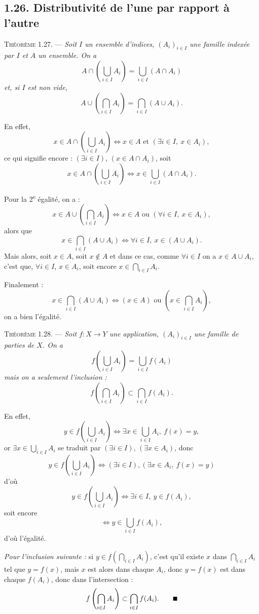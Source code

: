 \subsection*{1.26. Distributivité de l'une par rapport à l'autre}

\medskip\noindent\textsc{Théorème 1.27.} --- \emph{Soit $I$ un ensemble d'indices, $(A_i)_{i\in I}$ une famille indexée par $I$ et $A$ un ensemble. On a}
\[
A\cap\left(\bigcup_{i\in I}A_i\right)=\bigcup_{i\in I}(A\cap A_i)
\]
\emph{et, si $I$ est non vide,}
\[
A\cup\left(\bigcap_{i\in I}A_i\right)=\bigcap_{i\in I}(A\cup A_i).
\]

En effet,
\[
x\in A\cap\left(\bigcup_{i\in I}A_i\right)\Leftrightarrow x\in A\text{ et }(\exists i\in I,\ x\in A_i),
\]
ce qui signifie encore : $(\exists i\in I)$, $(x\in A\cap A_i)$, soit
\[
x\in A\cap\left(\bigcup_{i\in I}A_i\right)\Leftrightarrow x\in\bigcup_{i\in I}(A\cap A_i).
\]

Pour la 2\textsuperscript{e} égalité, on a :
\[
x\in A\cup\left(\bigcap_{i\in I}A_i\right)\Leftrightarrow x\in A\text{ ou }(\forall i\in I,\ x\in A_i),
\]
alors que
\[
x\in\bigcap_{i\in I}(A\cup A_i)\Leftrightarrow\forall i\in I,\ x\in(A\cup A_i).
\]
Mais alors, soit $x\in A$, soit $x\notin A$ et dans ce cas, comme $\forall i\in I$ on a $x\in A\cup A_i$, c'est que, $\forall i\in I$, $x\in A_i$, soit encore $x\in\bigcap_{i\in I}A_i$.

Finalement :
\[
x\in\bigcap_{i\in I}(A\cup A_i)\Leftrightarrow(x\in A)\text{ ou }\left(x\in\bigcap_{i\in I}A_i\right),
\]
on a bien l'égalité. \bookend

\medskip\noindent\textsc{Théorème 1.28.} --- \emph{Soit $f:X\to Y$ une application, $(A_i)_{i\in I}$ une famille de parties de $X$. On a}
\[
f\left(\bigcup_{i\in I}A_i\right)=\bigcup_{i\in I}f(A_i)
\]
\emph{mais on a seulement l'inclusion :}
\[
f\left(\bigcap_{i\in I}A_i\right)\subset\bigcap_{i\in I}f(A_i).
\]

En effet,
\[
y\in f\left(\bigcup_{i\in I}A_i\right)\Leftrightarrow\exists x\in\bigcup_{i\in I}A_i,\ f(x)=y,
\]
or $\exists x\in\bigcup_{i\in I}A_i$ se traduit par $(\exists i\in I)$, $(\exists x\in A_i)$, donc
\[
y\in f\left(\bigcup_{i\in I}A_i\right)\Leftrightarrow(\exists i\in I),(\exists x\in A_i,\ f(x)=y)
\]
d'où
\[
y\in f\left(\bigcup_{i\in I}A_i\right)\Leftrightarrow\exists i\in I,\ y\in f(A_i),
\]
soit encore
\[
\Leftrightarrow y\in\bigcup_{i\in I}f(A_i),
\]
d'où l'égalité.

\emph{Pour l'inclusion suivante :} si $y\in f\left(\bigcap_{i\in I}A_i\right)$, c'est qu'il existe $x$ dans $\bigcap_{i\in I}A_i$ tel que $y=f(x)$, mais $x$ est alors dans chaque $A_i$, donc $y=f(x)$ est dans chaque $f(A_i)$, donc dans l'intersection :
\[
f\left(\bigcap_{i\in I}A_i\right)\subset\bigcap_{i\in I}f(A_i).\qquad\rule{0.55em}{0.55em}
\]


